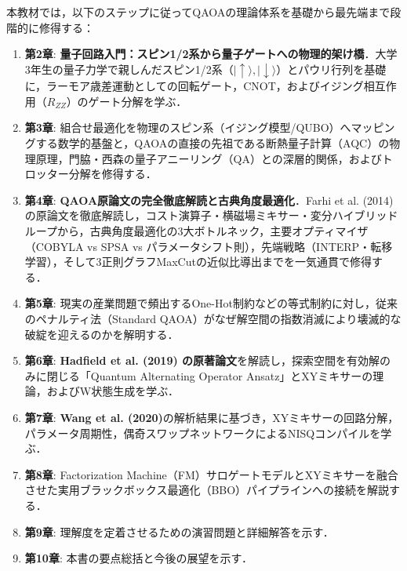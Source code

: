 \documentclass[11pt,a4paper,oneside,openany]{ltjsbook}
\theoremstyle{definition}
\theoremstyle{plain}
\theoremstyle{remark}
\newcommand{\ket}[1]{|#1\rangle}
\begin{document}
本教材では，以下のステップに従ってQAOAの理論体系を基礎から最先端まで段階的に修得する：
\begin{enumerate}\setlength{\itemsep}{0pt}\setlength{\parskip}{0pt}
    \item \textbf{第2章}: \textbf{量子回路入門：スピン1/2系から量子ゲートへの物理的架け橋}．大学3年生の量子力学で親しんだスピン1/2系（$\ket{\uparrow}, \ket{\downarrow}$）とパウリ行列を基礎に，ラーモア歳差運動としての回転ゲート，CNOT，およびイジング相互作用（$R_{ZZ}$）のゲート分解\cite{nielsen2010quantum,barenco1995elementary}を学ぶ．
    \item \textbf{第3章}: 組合せ最適化を物理のスピン系（イジング模型/QUBO）へマッピングする数学的基盤\cite{lucas2014ising}と，QAOAの直接の先祖である断熱量子計算（AQC）の物理原理\cite{farhi2000quantum,farhi2001quantum,born1928beweis,kato1950adiabatic,jansen2007bounds}，門脇・西森の量子アニーリング（QA）\cite{kadowaki1998quantum}との深層的関係，およびトロッター分解\cite{trotter1959product,suzuki1976generalized,lloyd1996universal}を修得する．
    \item \textbf{第4章}: \textbf{QAOA原論文の完全徹底解読と古典角度最適化}．Farhi et al. (2014) の原論文\cite{farhi2014quantum}を徹底解読し，コスト演算子・横磁場ミキサー・変分ハイブリッドループから，古典角度最適化の3大ボトルネック，主要オプティマイザ（COBYLA vs SPSA vs パラメータシフト則），先端戦略（INTERP・転移学習），そして3正則グラフMaxCutの近似比導出までを一気通貫で修得する．
    \item \textbf{第5章}: 現実の産業問題で頻出するOne-Hot制約などの等式制約に対し，従来のペナルティ法（Standard QAOA）がなぜ解空間の指数消滅により壊滅的な破綻を迎えるのかを解明する\cite{lucas2014ising,choi2008different,hadfield2019from}．
    \item \textbf{第6章}: \textbf{Hadfield et al. (2019) の原著論文}\cite{hadfield2019from}を解読し，探索空間を有効解のみに閉じる「Quantum Alternating Operator Ansatz」とXYミキサーの理論，およびW状態生成\cite{bartschi2019deterministic}を学ぶ．
    \item \textbf{第7章}: \textbf{Wang et al. (2020)}\cite{wang2020xy}の解析結果に基づき，XYミキサーの回路分解，パラメータ周期性，偶奇スワップネットワーク\cite{kivlichan2018quantum}によるNISQコンパイルを学ぶ．
    \item \textbf{第8章}: Factorization Machine（FM\cite{rendle2010factorization}）サロゲートモデルとXYミキサーを融合させた実用ブラックボックス最適化（BBO\cite{kitai2020designing}）パイプラインへの接続を解説する．
    \item \textbf{第9章}: 理解度を定着させるための演習問題と詳細解答を示す．
    \item \textbf{第10章}: 本書の要点総括と今後の展望を示す．
\end{enumerate}
\end{document}
